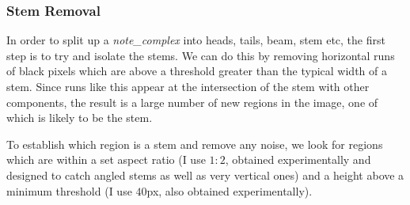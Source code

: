 \subsubsection{Stem Removal}\label{sec:stem-removal}

In order to split up a \emph{note\_complex} into heads, tails, beam, stem etc, the first step is to try and isolate the stems. We can do this by removing horizontal runs of black pixels which are above a threshold greater than the typical width of a stem. Since runs like this appear at the intersection of the stem with other components, the result is a large number of new regions in the image, one of which is likely to be the stem.

To establish which region is a stem and remove any noise, we look for regions which are within a set aspect ratio (I use $1:2$, obtained experimentally and designed to catch angled stems as well as very vertical ones) and a height above a minimum threshold (I use $40$px, also obtained experimentally).

